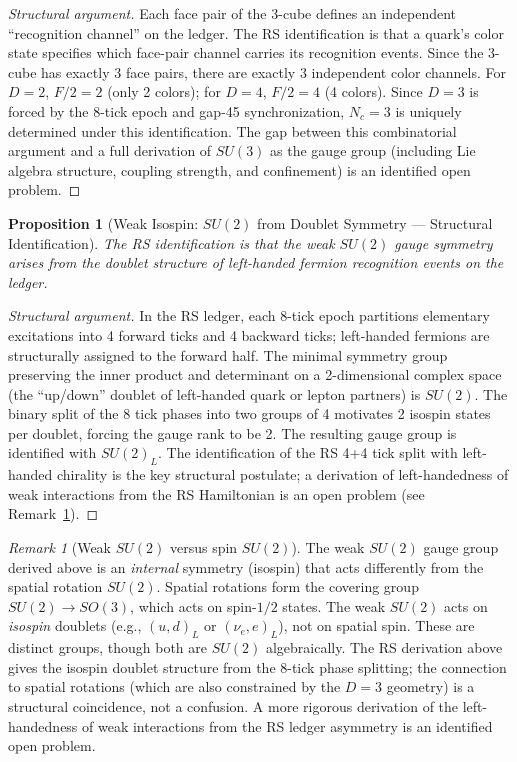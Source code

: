 \documentclass[12pt,a4paper]{article}
\newtheorem{proposition}[theorem]{Proposition}
\theoremstyle{definition}
\theoremstyle{remark}
\newtheorem{remark}[theorem]{Remark}
\begin{document}
\begin{proof}[Structural argument]
Each face pair of the 3-cube defines an independent
``recognition channel'' on the ledger.  The RS identification is that a quark's
color state specifies which face-pair channel carries its recognition events.
Since the 3-cube has exactly 3 face pairs, there are exactly 3 independent
color channels.  For $D = 2$, $F/2 = 2$ (only 2 colors); for $D = 4$,
$F/2 = 4$ (4 colors).  Since $D = 3$ is forced by the 8-tick epoch and
gap-45 synchronization, $N_c = 3$ is uniquely determined under this
identification.  The gap between this combinatorial argument and a full
derivation of $SU(3)$ as the gauge group (including Lie algebra structure,
coupling strength, and confinement) is an identified open problem.
\end{proof}

\begin{proposition}[Weak Isospin: $SU(2)$ from Doublet Symmetry --- Structural Identification]
\label{thm:su2}
The RS identification is that the weak $SU(2)$ gauge symmetry arises from the
doublet structure of left-handed fermion recognition events on the ledger.
\end{proposition}

\begin{proof}[Structural argument]
In the RS ledger, each 8-tick epoch partitions elementary
excitations into 4 forward ticks and 4 backward ticks; left-handed
fermions are structurally assigned to the forward half.  The minimal
symmetry group preserving the inner product and determinant on a
2-dimensional complex space (the ``up/down'' doublet of left-handed
quark or lepton partners) is $SU(2)$.  The binary split of the 8
tick phases into two groups of 4 motivates 2 isospin states per
doublet, forcing the gauge rank to be 2.  The resulting gauge group is
identified with $SU(2)_L$.  The identification of the RS 4+4 tick split
with left-handed chirality is the key structural postulate; a derivation of
left-handedness of weak interactions from the RS Hamiltonian is an open problem
(see Remark~\ref{rem:su2-distinction}).
\end{proof}

\begin{remark}[Weak $SU(2)$ versus spin $SU(2)$]
\label{rem:su2-distinction}
The weak $SU(2)$ gauge group derived above is an \emph{internal}
symmetry (isospin) that acts differently from the spatial rotation
$SU(2)$.  Spatial rotations form the covering group
$SU(2) \to SO(3)$, which acts on spin-$1/2$ states.  The weak
$SU(2)$ acts on \emph{isospin} doublets (e.g., $(u, d)_L$ or
$(\nu_e, e)_L$), not on spatial spin.  These are distinct groups,
though both are $SU(2)$ algebraically.  The RS derivation above
gives the isospin doublet structure from the 8-tick phase splitting;
the connection to spatial rotations (which are also constrained by the
$D = 3$ geometry) is a structural coincidence, not a confusion.
A more rigorous derivation of the left-handedness of weak interactions
from the RS ledger asymmetry is an identified open problem.
\end{remark}
\end{document}
